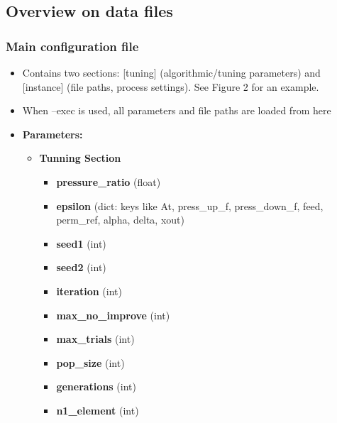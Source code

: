 \documentclass[12pt]{article}
\theoremstyle{definition}
\theoremstyle{definition}
\theoremstyle{remark}
\theoremstyle{remark}
\theoremstyle{definition}
\theoremstyle{remark}
\begin{document}
\subsection{Overview on data files}
\subsubsection{Main configuration file}
\begin{itemize}
	\item Contains two sections: [tuning] (algorithmic/tuning parameters) and [instance] (file paths, process settings). See Figure 2 for an example.
	\item When --exec is used, all parameters and file paths are loaded from here
	\item \textbf{Parameters:}
		\begin{itemize}

			\item \textbf{Tunning Section}
			\begin{itemize}
				
\item \textbf{pressure\_ratio }(float)
\item \textbf{epsilon }(dict: keys like At, press\_up\_f, press\_down\_f, feed, perm\_ref, alpha, delta, xout)
\item \textbf{seed1 }(int)
\item \textbf{seed2 }(int)
\item \textbf{iteration }(int)
\item \textbf{max\_no\_improve }(int)
\item \textbf{max\_trials }(int)
\item \textbf{pop\_size }(int)
\item \textbf{generations }(int)
\item \textbf{n1\_element }(int)
			\end{itemize}


\end{itemize}
\end{itemize}
\end{document}
